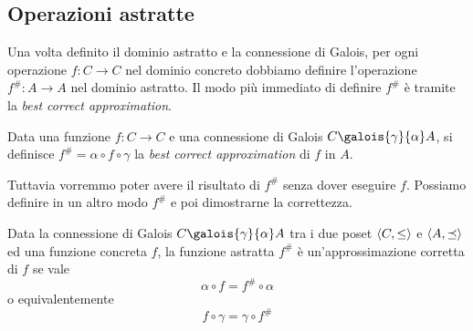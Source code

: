 \subsection{Operazioni astratte}

Una volta definito il dominio astratto e la connessione di Galois, per ogni operazione $f : C \to C$ nel dominio concreto dobbiamo definire l'operazione $f^{\#} : A \to A$ nel dominio astratto. Il modo più immediato di definire $f^{\#}$ è tramite la \emph{best correct approximation}.

\begin{definition}
Data una funzione $f : C \to C$ e una connessione di Galois $C \galois{\gamma}{\alpha} A$, si definisce $f^{\#} = \alpha \circ f \circ \gamma$ la \emph{best correct approximation} di $f$ in $A$.
\end{definition}

Tuttavia vorremmo poter avere il risultato di $f^{\#}$ senza dover eseguire $f$. Possiamo definire in un altro modo $f^{\#}$ e poi dimostrarne la correttezza.

\begin{definition}
Data la connessione di Galois $C \galois{\gamma}{\alpha} A$ tra i due poset $\langle C, \le \rangle$ e $\langle A, \preceq \rangle$ ed una funzione concreta $f$, la funzione astratta $f^{\#}$ è un'approssimazione corretta di $f$ se vale
\[ \alpha \circ f = f^{\#} \circ \alpha \]
o equivalentemente
\[ f \circ \gamma = \gamma \circ f^{\#} \]
\end{definition}

